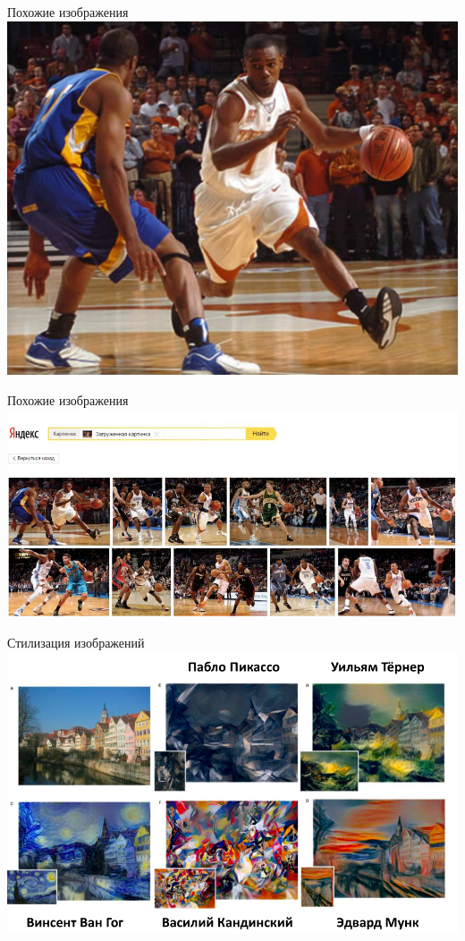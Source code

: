 \documentclass[10pt]{beamer}
\begin{document}
\begin{frame}{Похожие изображения}
  \centering
  \includegraphics[width=0.9 \textwidth, keepaspectratio = true]{images/similar}   
\end{frame}

\begin{frame}{Похожие изображения}
  \centering
  \includegraphics[width=\textwidth, keepaspectratio = true]{images/similar2}   
\end{frame}

{
\begin{frame}{Стилизация изображений}
  \centering
  \includegraphics[width=\textwidth, keepaspectratio = true]{images/style}   
\end{frame}
}
\end{document}
